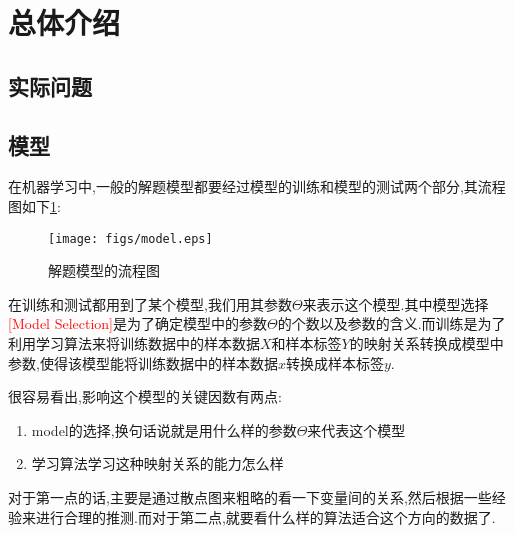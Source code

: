 \section{总体介绍}
\subsection{实际问题}
\subsection{模型}
在机器学习中,一般的解题模型都要经过模型的训练和模型的测试两个部分,其流程图如下\ref{gd:figure:model}:
\begin{figure}[!htbp]
	\centering
	\texttt{[image: figs/model.eps]} 
	\caption{解题模型的流程图}    	
	\label{gd:figure:model}
\end{figure}


在训练和测试都用到了某个模型,我们用其参数$\Theta$来表示这个模型.其中模型选择\textcolor{red}{[Model Selection]}是为了确定模型中的参数$\Theta$的个数以及参数的含义.而训练是为了利用学习算法来将训练数据中的样本数据$X$和样本标签$Y$的映射关系转换成模型中参数,使得该模型能将训练数据中的样本数据$x$转换成样本标签$y$.


很容易看出,影响这个模型的关键因数有两点:
\begin{enumerate}
\item model的选择,换句话说就是用什么样的参数$\Theta$来代表这个模型
\item 学习算法学习这种映射关系的能力怎么样
\end{enumerate}
对于第一点的话,主要是通过散点图来粗略的看一下变量间的关系,然后根据一些经验来进行合理的推测.而对于第二点,就要看什么样的算法适合这个方向的数据了.



\newpage